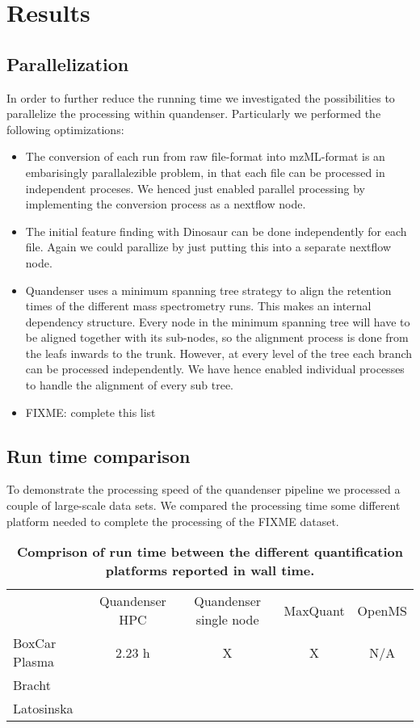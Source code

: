 \documentclass[11pt]{article}
\begin{document}
\section*{Results}

\subsection*{Parallelization}
In order to further reduce the running time we investigated the possibilities to parallelize the processing within quandenser. Particularly we performed the following optimizations:
\begin{itemize}
  \item The conversion of each run from raw file-format into mzML-format is an embarisingly parallalezible problem, in that each file can be processed in independent proceses. We henced just enabled parallel processing by implementing the conversion process as a nextflow node.
  \item The initial feature finding with Dinosaur\cite{teleman2016dinosaur} can be done independently for each file. Again we could parallize by just putting this into a separate nextflow node.
  \item Quandenser uses a minimum spanning tree strategy \cite{rost2016tric} to align the retention times of the different mass spectrometry runs. This makes an internal dependency structure. Every node in the minimum spanning tree will have to be aligned together with its sub-nodes, so the alignment process is done from the leafs inwards to the trunk.  However, at every level of the tree each branch can be processed independently. We have hence enabled individual processes to handle the alignment of every sub tree.
  \item FIXME: complete this list
\end{itemize}

\subsection*{Run time comparison}

To demonstrate the processing speed of the quandenser pipeline we processed a couple of large-scale data sets. We compared the processing time some different platform needed to complete the processing of the FIXME dataset.
\begin{table}
  \caption{{\bf Comprison of run time between the different quantification platforms reported in wall time.}}
  \label{table:walltime}
\begin{tabular}{lcccc}
& Quandenser HPC & Quandenser single node & MaxQuant & OpenMS \\
BoxCar Plasma & 2.23 h & X & X & N/A \\
Bracht &  & &&  \\
Latosinska & &&& \\
\end{tabular}
\end{table}
\end{document}
